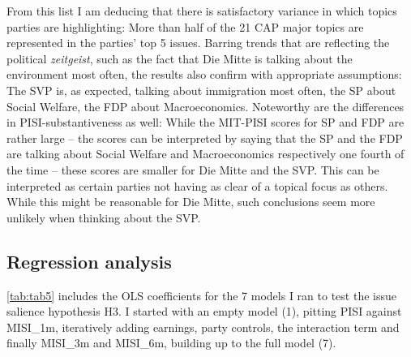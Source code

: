 \documentclass[11pt,a4paper]{article}
\begin{document}
From this list I am deducing that there is satisfactory variance in which topics parties are highlighting: More than half of the 21 CAP major topics are represented in the parties’ top 5 issues. Barring trends that are reflecting the political \textit{zeitgeist}, such as the fact that Die Mitte is talking about the environment most often, the results also confirm with appropriate assumptions: The SVP is, as expected, talking about immigration most often, the SP about Social Welfare, the FDP about Macroeconomics. Noteworthy are the differences in PISI-substantiveness as well: While the MIT-PISI scores for SP and FDP are rather large – the scores can be interpreted by saying that the SP and the FDP are talking about Social Welfare and Macroeconomics respectively one fourth of the time – these scores are smaller for Die Mitte and the SVP. This can be interpreted as certain parties not having as clear of a topical focus as others. While this might be reasonable for Die Mitte, such conclusions seem more unlikely when thinking about the SVP.


\subsection{Regression analysis}
\autoref{tab:tab5} includes the OLS coefficients for the 7 models I ran to test the issue salience hypothesis H3. I started with an empty model (1), pitting PISI against MISI\_1m, iteratively adding earnings, party controls, the interaction term and finally MISI\_3m and MISI\_6m, building up to the full model (7).
\end{document}
